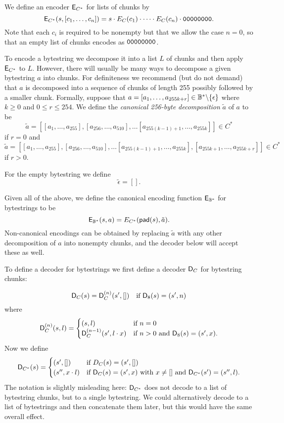 \noindent
We define an encoder $\mathsf{E}_{C^*}$ for lists of chunks by 
$$
\mathsf{E}_{C^*} (s, [c_1, \ldots, c_n]) = s \cdot E_C(c_1) \cdot \cdots \cdot E_C(c_n) \cdot \mathtt{00000000}.
$$
\noindent Note that each $c_i$ is required to be nonempty but that we allow the
case $n = 0$, so that an empty list of chunks encodes as $\mathtt{00000000}$.

\medskip
\noindent To encode a bytestring we decompose it into a list $L$ of chunks and
then apply $\mathsf{E}_{C^*}$ to $L$.  However, there will usually be many ways to
decompose a given bytestring $a$ into chunks. For definiteness we recommend (but
do not demand) that $a$ is decomposed into a sequence of chunks of length 255
possibly followed by a smaller chunk.  Formally, suppose that $a = [a_1, \ldots,
  a_{255k+r}] \in \mathbb{B}^*\backslash\{\epsilon\}$ where $k \geq 0$ and $0 \leq r
\leq 254$.  We define the \textit{canonical 256-byte decomposition} $\tilde{a}$ of $a$ to
be
$$
\tilde{a} = [[a_1, \ldots, a_{255}],
  [a_{256}, \ldots, a_{510}],\ldots
  [a_{255(k-1)+1}, \ldots, a_{255k}]] \in C^*
$$
\noindent if $r=0$ and
$$
\tilde{a} = [[a_1, \ldots, a_{255}],
  [a_{256}, \ldots, a_{510}],\ldots
  [a_{255(k-1)+1}, \ldots, a_{255k}], [a_{255k+1}, \ldots, a_{255k+r}]] \in C^*
$$
\noindent if $r>0$.

\smallskip
\noindent For the empty bytestring we define
$$
\tilde{\epsilon} = [].
$$

\medskip
\noindent Given all of the above, we define the canonical encoding function
$\mathsf{E}_{\mathbb{B}^*}$ for bytestrings to be
$$
\mathsf{E}_{\mathbb{B}^*}(s, a) = E_{C^*}(\mathsf{pad}(s), \tilde{a}).
$$
\noindent Non-canonical encodings can be obtained by replacing $\tilde{a}$ with any
other decomposition of $a$ into nonempty chunks, and the decoder below will
accept these as well.

\bigskip

\noindent To define a decoder for bytestrings we first define a decoder
$\mathsf{D}_{C}$ for bytestring chunks:

$$
\mathsf{D}_{C}(s) = \mathsf{D}_C^{(n)}(s',[]) \quad \text{if $\mathsf{D}_8(s) = (s', n)$}
$$
where
$$
\mathsf{D}^{(n)}_C (s, l) =
\begin{cases}
  (s, l) & \text{if $n=0$}\\
  \mathsf{D}^{(n-1)}_C (s',l\cdot x)  & \text{if $n > 0$ and $\mathsf{D}_8(s) = (s',x)$.}
\end{cases}
$$
Now we define
$$
\mathsf{D}_{C^*}(s) =
\begin{cases}
  (s', []) & \text{if $D_C(s) = (s', [])$}\\
  (s'', x \cdot l) & \text{if $\mathsf{D}_C(s) = (s', x)$ with $x \ne []$ and $\mathsf{D}_{C^*}(s') = (s'', l)$}.
\end{cases}
$$
\noindent The notation is slightly misleading here: $\mathsf{D}_{C^*}$ does not
decode to a list of bytestring chunks, but to a single bytestring.  We
could alternatively decode to a list of bytestrings and then concatenate them
later, but this would have the same overall effect.

